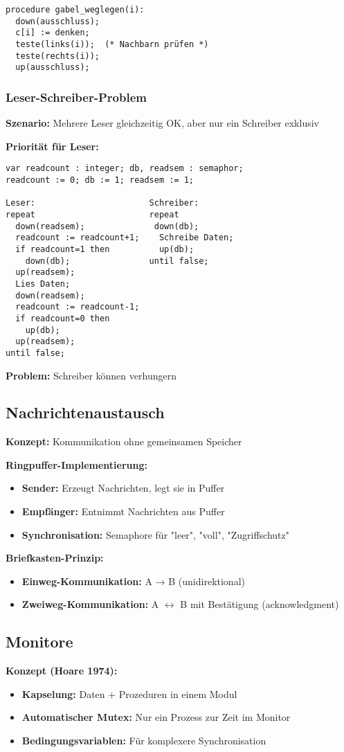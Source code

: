 \documentclass[9pt,a4paper]{extarticle}
\begin{document}
\begin{multicols*}{2}
\begin{verbatim}
procedure gabel_weglegen(i):
  down(ausschluss);
  c[i] := denken;
  teste(links(i));  (* Nachbarn prüfen *)
  teste(rechts(i));
  up(ausschluss);
\end{verbatim}

\subsubsection{Leser-Schreiber-Problem}
\textbf{Szenario:} Mehrere Leser gleichzeitig OK, aber nur ein Schreiber exklusiv

\textbf{Priorität für Leser:}
\begin{verbatim}
var readcount : integer; db, readsem : semaphor;
readcount := 0; db := 1; readsem := 1;

Leser:                       Schreiber:
repeat                       repeat
  down(readsem);              down(db);
  readcount := readcount+1;    Schreibe Daten;
  if readcount=1 then          up(db);
    down(db);                until false;
  up(readsem);
  Lies Daten;
  down(readsem);
  readcount := readcount-1;
  if readcount=0 then
    up(db);
  up(readsem);
until false;
\end{verbatim}

\textbf{Problem:} Schreiber können verhungern

\subsection{Nachrichtenaustausch}
\textbf{Konzept:} Kommunikation ohne gemeinsamen Speicher

\textbf{Ringpuffer-Implementierung:}
\begin{itemize}
\item \textbf{Sender:} Erzeugt Nachrichten, legt sie in Puffer
\item \textbf{Empfänger:} Entnimmt Nachrichten aus Puffer
\item \textbf{Synchronisation:} Semaphore für "leer", "voll", "Zugriffschutz"
\end{itemize}

\textbf{Briefkasten-Prinzip:}
\begin{itemize}
\item \textbf{Einweg-Kommunikation:} A → B (unidirektional)
\item \textbf{Zweiweg-Kommunikation:} A $\leftrightarrow$ B mit Bestätigung (acknowledgment)
\end{itemize}

\subsection{Monitore}
\textbf{Konzept (Hoare 1974):}
\begin{itemize}
\item \textbf{Kapselung:} Daten + Prozeduren in einem Modul
\item \textbf{Automatischer Mutex:} Nur ein Prozess zur Zeit im Monitor
\item \textbf{Bedingungsvariablen:} Für komplexere Synchronisation
\end{itemize}


\end{multicols*}
\end{document}
